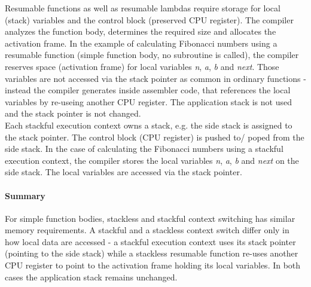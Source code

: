 Resumable functions as well as resumable lambdas require storage for local
(stack) variables and the control block (preserved CPU register). The compiler
analyzes the function body, determines the required size and allocates the
activation frame.
In the example of calculating Fibonacci numbers using a resumable function
(simple function body, no subroutine is called), the compiler reserves space
(activation frame) for local variables \textit{n}, \textit{a}, \textit{b} and
\textit{next}. Those variables are not accessed via the stack pointer as common
in ordinary functions - instead the compiler generates inside 
assembler code, that references the local variables by re-useing another CPU
register. The application stack is not used and the stack pointer is not
changed.\\
\newline
Each stackful execution context owns a stack, e.g. the side stack is assigned to
the stack pointer. The control block (CPU register) is pushed to/ poped from the
side stack.
In the case of calculating the Fibonacci numbers using a stackful execution
context, the compiler stores the local variables \textit{n}, \textit{a},
\textit{b} and \textit{next} on the side stack. The local variables are accessed
via the stack pointer.
\paragraph*{Summary}
For simple function bodies, stackless and stackful context switching has similar
memory requirements. A stackful and a stackless context switch differ only in
how local data are accessed - a stackful execution context uses its stack
pointer (pointing to the side stack) while a stackless resumable function
re-uses another CPU register to point to the activation frame holding its local
variables. In both cases the application stack remains unchanged.

